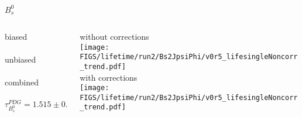 \begin{frame}{$B_s^0$}
  
  \begin{columns}
  
  \begin{column}{0.45\textwidth}
  {\color{scqorange}biased} \\[2mm]
  \resizebox{\textwidth}{!}{}\\[5mm]
  {\color{scqred}unbiased} \\[2mm]
  \resizebox{\textwidth}{!}{}\\[5mm]
  {\color{scqgreen}combined} \\[2mm]
  \resizebox{\textwidth}{!}{}\\
  \begin{equation*}
    \tau_{B_s^0}^{PDG} = 1.515 \pm 0.004
  \end{equation*}
  \end{column}
  
  \begin{column}{0.45\textwidth}
  \footnotesize
  {without corrections}\\[2mm]
  \texttt{[image: \\FIGS/lifetime/run2/Bs2JpsiPhi/v0r5\_lifesingleNoncorr\_trend.pdf]}\\[3mm]
  {with corrections}\\[2mm]
  \texttt{[image: \\FIGS/lifetime/run2/Bs2JpsiPhi/v0r5\_lifesingleNoncorr\_trend.pdf]}
  \end{column}
  
  \end{columns}

\end{frame}



